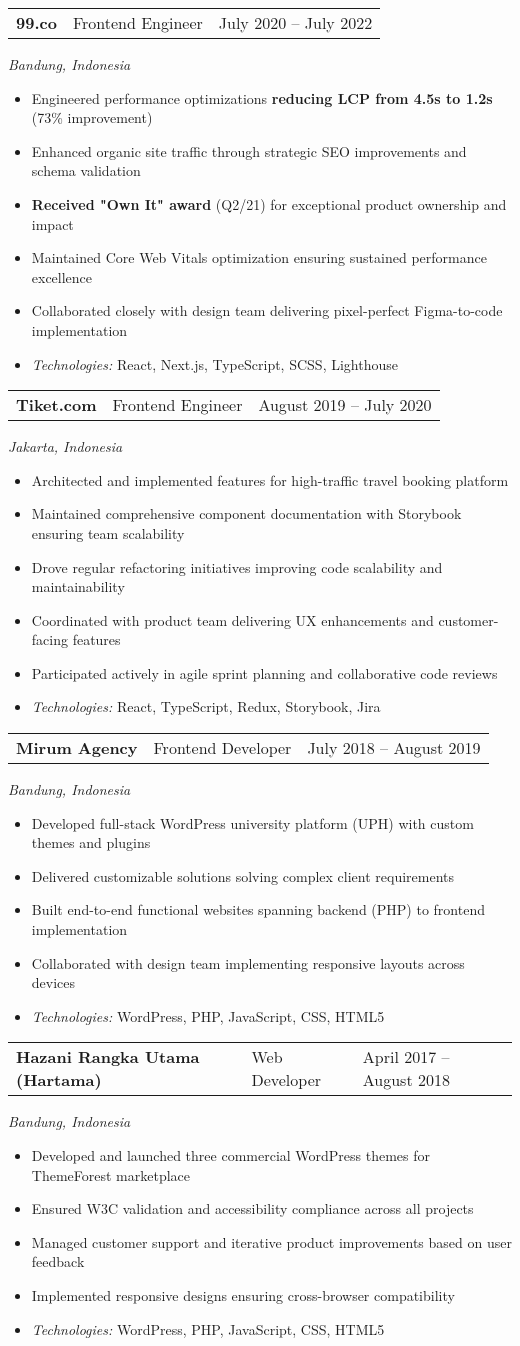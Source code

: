 \documentclass[a4paper, 11pt]{article}
\newcommand{\resumeItem}[1]{
  \item\small{
    {#1 \vspace{-2pt}}
  }
}
\newcommand{\resumeSubheading}[4]{
  \vspace{-2pt}\item
    \begin{tabularx}{0.987\textwidth}[t]{
  >{\raggedright\arraybackslash}X
  >{\centering\arraybackslash}X
  >{\raggedleft\arraybackslash}X }
      \textbf{#1} & #2 & #3 \\
    \end{tabularx}
    \textit{\small#4}\\
    \vspace{-7pt}
}
\newcommand{\resumeItemListStart}{\begin{itemize}[leftmargin=0.22in]}
\newcommand{\resumeItemListEnd}{\end{itemize}\vspace{-20pt}}
\begin{document}
      \resumeSubheading
        {99.co}{Frontend Engineer}{July 2020 -- July 2022}
        {Bandung, Indonesia}
        \resumeItemListStart
          \resumeItem{Engineered performance optimizations \textbf{reducing LCP from 4.5s to 1.2s} (73\% improvement)}
          \resumeItem{Enhanced organic site traffic through strategic SEO improvements and schema validation}
          \resumeItem{\textbf{Received "Own It" award} (Q2/21) for exceptional product ownership and impact}
          \resumeItem{Maintained Core Web Vitals optimization ensuring sustained performance excellence}
          \resumeItem{Collaborated closely with design team delivering pixel-perfect Figma-to-code implementation}
          \resumeItem{\textit{Technologies:} React, Next.js, TypeScript, SCSS, Lighthouse}
        \resumeItemListEnd

      \resumeSubheading
        {Tiket.com}{Frontend Engineer}{August 2019 -- July 2020}
        {Jakarta, Indonesia}
        \resumeItemListStart
          \resumeItem{Architected and implemented features for high-traffic travel booking platform}
          \resumeItem{Maintained comprehensive component documentation with Storybook ensuring team scalability}
          \resumeItem{Drove regular refactoring initiatives improving code scalability and maintainability}
          \resumeItem{Coordinated with product team delivering UX enhancements and customer-facing features}
          \resumeItem{Participated actively in agile sprint planning and collaborative code reviews}
          \resumeItem{\textit{Technologies:} React, TypeScript, Redux, Storybook, Jira}
        \resumeItemListEnd

      \resumeSubheading
        {Mirum Agency}{Frontend Developer}{July 2018 -- August 2019}
        {Bandung, Indonesia}
        \resumeItemListStart
          \resumeItem{Developed full-stack WordPress university platform (UPH) with custom themes and plugins}
          \resumeItem{Delivered customizable solutions solving complex client requirements}
          \resumeItem{Built end-to-end functional websites spanning backend (PHP) to frontend implementation}
          \resumeItem{Collaborated with design team implementing responsive layouts across devices}
          \resumeItem{\textit{Technologies:} WordPress, PHP, JavaScript, CSS, HTML5}
        \resumeItemListEnd

      \resumeSubheading
        {Hazani Rangka Utama (Hartama)}{Web Developer}{April 2017 -- August 2018}
        {Bandung, Indonesia}
        \resumeItemListStart
          \resumeItem{Developed and launched three commercial WordPress themes for ThemeForest marketplace}
          \resumeItem{Ensured W3C validation and accessibility compliance across all projects}
          \resumeItem{Managed customer support and iterative product improvements based on user feedback}
          \resumeItem{Implemented responsive designs ensuring cross-browser compatibility}
          \resumeItem{\textit{Technologies:} WordPress, PHP, JavaScript, CSS, HTML5}
        \resumeItemListEnd
\end{document}
